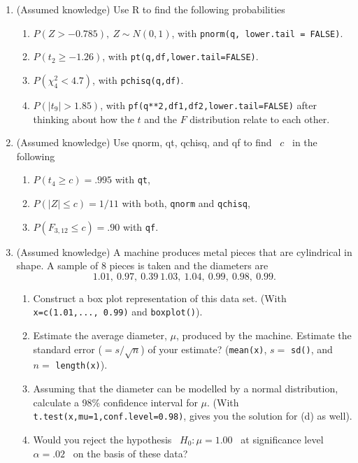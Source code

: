 \documentclass[11pt,a4paper]{article}
\begin{document}
\begin{enumerate}
\item (Assumed knowledge) Use R to find the following probabilities
\begin{enumerate}
\item $P(Z > - 0.785), \ Z \sim N(0,1)$, with \texttt{pnorm(q, lower.tail = FALSE)}.
\item $P(t_2 \geq -1.26)$, with \texttt{pt(q,df,lower.tail=FALSE)}.
\item $P(\chi_4^2 < 4.7)$, with \texttt{pchisq(q,df)}. 
\item $P(|t_{9}| > 1.85)$, with \texttt{pf(q**2,df1,df2,lower.tail=FALSE)} after thinking about how the $t$ and the $F$ distribution relate to each other.
\end{enumerate}

\bigskip
\item (Assumed knowledge) Use {qnorm}, {qt}, {qchisq}, and {qf} to find \ $c$ \ in the following
\begin{enumerate}
\item $P(t_4 \geq c) = .995$ with \texttt{qt},
\item $P(|Z| \leq c) = 1/11$ with both, \texttt{qnorm} and \texttt{qchisq},
\item $P(F_{3,12} \leq c) = .90$ with \texttt{qf}.
\end{enumerate}

\bigskip
\item (Assumed knowledge) A machine produces metal pieces that are cylindrical in shape.  A sample of 8 pieces
is taken and the diameters are $$ 1.01, \ 0.97, \ 0.39 \ 1.03, \ 1.04, \ 0.99, \ 0.98, \ 0.99. $$
\begin{enumerate}
\item  Construct a box plot representation of this data set. (With \texttt{x=c(1.01,..., 0.99)} and 
\texttt{boxplot()}).
\item   Estimate the average diameter, $\mu$, produced by
the machine. Estimate the standard error ($=s/\sqrt{n}$) of your estimate? (\texttt{mean(x)}, $s=$ \texttt{sd()}, and $n=$ \texttt{length(x)}). 
\item  Assuming that the diameter can be modelled by a normal distribution,
calculate a 98\% confidence interval for $\mu$. (With \texttt{t.test(x,mu=1,conf.level=0.98)}, gives you the solution for (d) as well).
\item  Would you reject the hypothesis \ $H_0 : \mu = 1.00$ \ at significance level
\ $\alpha = .02$ \ on the basis of these data?
\end{enumerate}


\end{enumerate}
\end{document}
